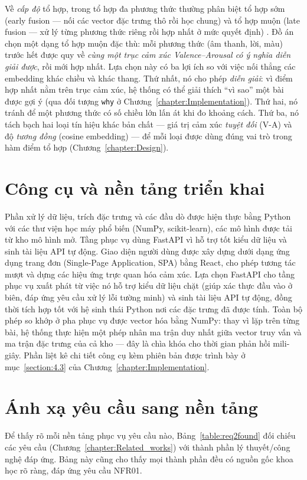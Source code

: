 \documentclass[../DoAn.tex]{subfiles}
\begin{document}
Về \textit{cấp độ} tổ hợp, trong tổ hợp đa phương thức thường phân biệt tổ hợp sớm (early fusion --- nối các vector đặc trưng thô rồi học chung) và tổ hợp muộn (late fusion --- xử lý từng phương thức riêng rồi hợp nhất ở mức quyết định) \cite{baltrusaitis2019multimodal}. Đồ án chọn một dạng tổ hợp muộn đặc thù: mỗi phương thức (âm thanh, lời, màu) trước hết được quy về \textit{cùng một trục cảm xúc Valence--Arousal có ý nghĩa diễn giải được}, rồi mới hợp nhất. Lựa chọn này có ba lợi ích so với việc nối thẳng các embedding khác chiều và khác thang. Thứ nhất, nó cho phép \textit{diễn giải}: vì điểm hợp nhất nằm trên trục cảm xúc, hệ thống có thể giải thích ``vì sao'' một bài được gợi ý (qua đối tượng \texttt{why} ở Chương~\ref{chapter:Implementation}). Thứ hai, nó tránh để một phương thức có số chiều lớn lấn át khi đo khoảng cách. Thứ ba, nó tách bạch hai loại tín hiệu khác bản chất --- giá trị cảm xúc \textit{tuyệt đối} (V-A) và độ \textit{tương đồng} (cosine embedding) --- để mỗi loại được dùng đúng vai trò trong hàm điểm tổ hợp (Chương~\ref{chapter:Design}).

\section{Công cụ và nền tảng triển khai}
\label{section:3.6}
Phần xử lý dữ liệu, trích đặc trưng và các đầu dò được hiện thực bằng Python với các thư viện học máy phổ biến (NumPy, scikit-learn), các mô hình được tải từ kho mô hình mở. Tầng phục vụ dùng FastAPI vì hỗ trợ tốt kiểu dữ liệu và sinh tài liệu API tự động. Giao diện người dùng được xây dựng dưới dạng ứng dụng trang đơn (Single-Page Application, SPA) bằng React, cho phép tương tác mượt và dựng các hiệu ứng trực quan hóa cảm xúc. Lựa chọn FastAPI cho tầng phục vụ xuất phát từ việc nó hỗ trợ kiểu dữ liệu chặt (giúp xác thực đầu vào ở biên, đáp ứng yêu cầu xử lý lỗi tường minh) và sinh tài liệu API tự động, đồng thời tích hợp tốt với hệ sinh thái Python nơi các đặc trưng đã được tính. Toàn bộ phép so khớp ở pha phục vụ được vector hóa bằng NumPy: thay vì lặp trên từng bài, hệ thống thực hiện một phép nhân ma trận duy nhất giữa vector truy vấn và ma trận đặc trưng của cả kho --- đây là chìa khóa cho thời gian phản hồi mili-giây. Phần liệt kê chi tiết công cụ kèm phiên bản được trình bày ở mục~\ref{section:4.3} của Chương~\ref{chapter:Implementation}.

\section{Ánh xạ yêu cầu sang nền tảng}
\label{section:3.7}
Để thấy rõ mỗi nền tảng phục vụ yêu cầu nào, Bảng~\ref{table:req2found} đối chiếu các yêu cầu (Chương~\ref{chapter:Related_works}) với thành phần lý thuyết/công nghệ đáp ứng. Bảng này cũng cho thấy mọi thành phần đều có nguồn gốc khoa học rõ ràng, đáp ứng yêu cầu NFR01.
\end{document}
